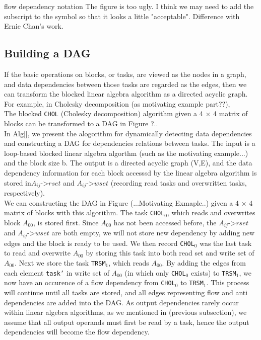 \documentclass[preprint,11pt]{elsarticle}
\begin{document}
  flow dependency notation
  The figure is too ugly. I think we may need to add the subscript to the symbol so that it looks a little "acceptable".
  Difference with Ernie Chan's work.
  \subsection{Building a DAG}
  If the basic operations on blocks, or tasks, are viewed as the nodes in a graph, and data dependencies between those tasks are regarded as the edges, then we can transform the blocked linear algebra algorithm as a directed acyclic graph. 
  For example, in Cholesky decomposition (as motivating example part??), \\
  The blocked \texttt{CHOL} (Cholesky decomposition) algorithm given a 4 $\times$ 4 matrix of blocks can be transformed to a DAG in Figure {?}.. \\
  In Alg[], we present the alogorithm for dynamically detecting data dependencies and constructing a DAG for dependencies relations between tasks. The input is a loop-based blocked linear algebra algorthm  (such as the motivating example...) and the block size b. The output is a directed acyclic graph (V,E), and the data dependency information for each block accesssd by the linear algebra algorithm is stored in$A_{ij}\texttt{->}rset$ and $A_{ij}\texttt{->}wset$ (recording read tasks and overwritten tasks, respectively).\\
  We can constructing the DAG in Figure {(...Motivating Exmaple..)} given a 4 $\times$ 4 matrix of blocks with this algorithm. The task \texttt{CHOL$_0$}, which reads and overwrites block $A_{00}$, is stored first. Since $A_{00}$ has not been accessed before, the $A_{ij}\texttt{->}rset$ and $A_{ij}\texttt{->}wset$ are both empty, we will not store new dependency by adding new edges and the block is ready to be used. We then record \texttt{CHOL$_0$} was the last task to read and overwrite $A_{00}$ by storing this task into both read set and write set of $A_{00}$. Next we store the task \texttt{TRSM$_1$}, which reads $A_{00}$. By adding the edges from each element \texttt{task'} in write set of $A_{00}$ (in which only \texttt{CHOL$_0$} exists) to \texttt{TRSM$_1$},  we now have an occurence of a flow dependency from \texttt{CHOL$_0$} to \texttt{TRSM$_1$}. This process will continue until all tasks are stored, and all edges representing flow and anti dependencies are added into the DAG. As output dependencies rarely occur within linear algebra algorithms, as we mentioned in (previous subsection), we assume that all output operands must first be read by a task, hence the output dependencies will become the flow dependency.\\
\end{document}
